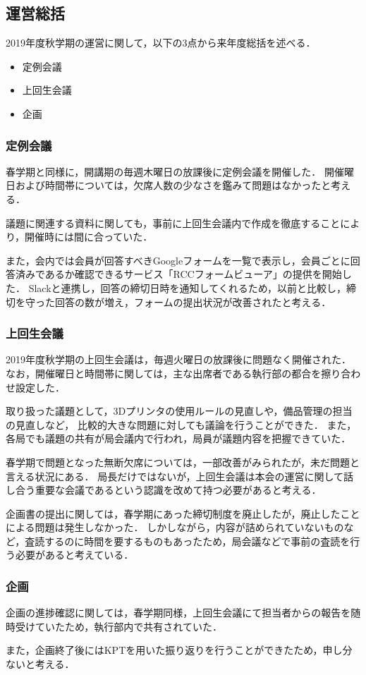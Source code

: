 \subsection*{運営総括}
2019年度秋学期の運営に関して，以下の3点から来年度総括を述べる．
\begin{itemize}
    \item 定例会議
    \item 上回生会議
    \item 企画
\end{itemize}

\subsubsection*{定例会議}
春学期と同様に，開講期の毎週木曜日の放課後に定例会議を開催した．
開催曜日および時間帯については，欠席人数の少なさを鑑みて問題はなかったと考える．

議題に関連する資料に関しても，事前に上回生会議内で作成を徹底することにより，開催時には間に合っていた．

また，会内では会員が回答すべきGoogleフォームを一覧で表示し，会員ごとに回答済みであるか確認できるサービス「RCCフォームビューア」の提供を開始した．
Slackと連携し，回答の締切日時を通知してくれるため，以前と比較し，締切を守った回答の数が増え，フォームの提出状況が改善されたと考える．

\subsubsection*{上回生会議}
2019年度秋学期の上回生会議は，毎週火曜日の放課後に問題なく開催された．
なお，開催曜日と時間帯に関しては，主な出席者である執行部の都合を擦り合わせ設定した．

取り扱った議題として，3Dプリンタの使用ルールの見直しや，備品管理の担当の見直しなど，
比較的大きな問題に対しても議論を行うことができた．
また，各局でも議題の共有が局会議内で行われ，局員が議題内容を把握できていた．

春学期で問題となった無断欠席については，一部改善がみられたが，未だ問題と言える状況にある．
局長だけではないが，上回生会議は本会の運営に関して話し合う重要な会議であるという認識を改めて持つ必要があると考える．

企画書の提出に関しては，春学期にあった締切制度を廃止したが，廃止したことによる問題は発生しなかった．
しかしながら，内容が詰められていないものなど，査読するのに時間を要するものもあったため，局会議などで事前の査読を行う必要があると考えている．

\subsubsection*{企画}
企画の進捗確認に関しては，春学期同様，上回生会議にて担当者からの報告を随時受けていたため，執行部内で共有されていた．

また，企画終了後にはKPTを用いた振り返りを行うことができたため，申し分ないと考える．
